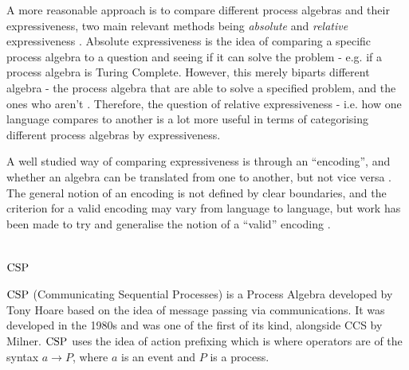 \documentclass[../hons_project.tex]{subfiles}
\begin{document}
A more reasonable approach is to compare different process algebras and their expressiveness, two main relevant methods being \textit{absolute} and \textit{relative} expressiveness \citep{parrowExpressivenessProcessAlgebras2008}. Absolute expressiveness is the idea of comparing a specific process algebra to a question and seeing if it can solve the problem - e.g. if a process algebra is Turing Complete. However, this merely biparts different algebra - the process algebra that are able to solve a specified problem, and the ones who aren't \citep{gorlaUnifiedApproachEncodability2010}. Therefore, the question of relative expressiveness - i.e. how one language compares to another is a lot more useful in terms of categorising different process algebras by expressiveness.

A well studied way of comparing expressiveness is through an ``encoding'', and whether an algebra can be translated from one to another, but not vice versa \citep{petersComparingProcessCalculi2019}. The general notion of an encoding is not defined by clear boundaries, and the criterion for a valid encoding may vary from language to language, but work has been made to try and generalise the notion of a ``valid'' encoding \citep{gorlaUnifiedApproachEncodability2010, DBLP:conf/fossacs/Glabbeek18}.

\section{\texorpdfstring{$\mathrm{CSP}$}{CSP}}
$\mathrm{CSP}$ (Communicating Sequential Processes) \citep{brookesTheoryCommunicatingSequential1984} is a Process Algebra developed by Tony Hoare based on the idea of message passing via communications. It was developed in the 1980s and was one of the first of its kind, alongside CCS by Milner. $\mathrm{CSP}$ uses the idea of action prefixing which is where operators are of the syntax $a \to P$, where $a$ is an event and $P$ is a process.

\end{document}
